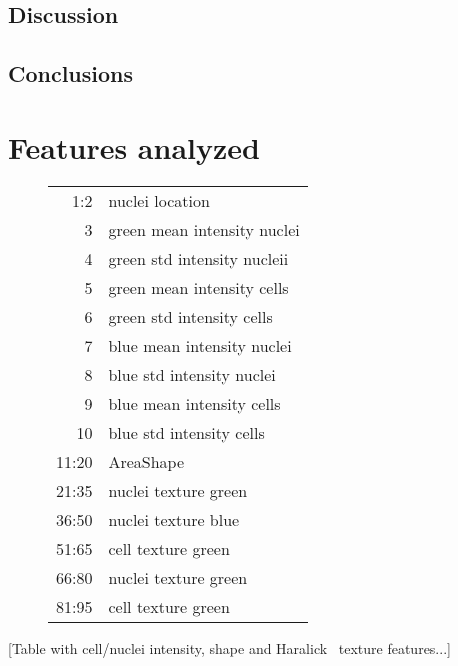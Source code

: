 \documentclass[oneside, a4paper, draft]{memoir} %
\begin{document}
\section{Discussion}
\textcolor{gray}{\lipsum[9]}

\section{Conclusions}
\textcolor{gray}{\lipsum[3]}


\nocite{duda2001pattern}


\appendix
\chapter{Features analyzed}\label{app:featurelist}
\begin{figure}[here]
\centering
\begin{tabular}{rl}
	1:2 & nuclei location\\

	3 & green mean intensity nuclei\\
	4 & green std intensity nucleii\\

	5 & green mean intensity cells\\
	6 & green std intensity cells\\

	7 & blue mean intensity nuclei\\
	8 & blue std intensity nuclei\\

	9 & blue mean intensity cells\\
	10 & blue std intensity cells\\

	11:20 & AreaShape\\


	21:35 & nuclei texture green\\
	36:50 & nuclei texture blue\\
	51:65 & cell texture green\\

	66:80 & nuclei texture green\\
	81:95 & cell texture green
\end{tabular}
\end{figure}
[Table with cell/nuclei intensity, shape and Haralick~\cite{haralick1973textural} texture features...]
\end{document}
